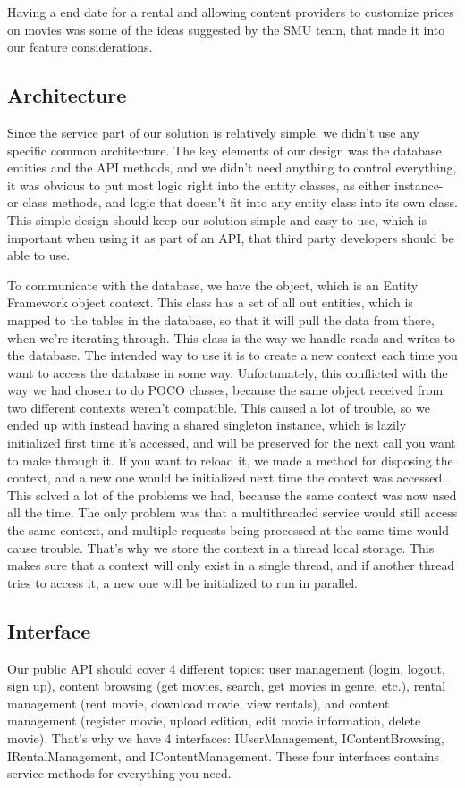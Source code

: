 Having a end date for a rental and allowing content providers to customize prices on movies was some of the ideas suggested by the SMU team, that made it into our feature considerations. 

\subsection{Architecture}
\label{Design_Service_Architecture}
Since the service part of our solution is relatively simple, we didn't use any specific common architecture. The key elements of our design was the database entities and the API methods, and we didn't need anything to control everything, it was obvious to put most logic right into the entity classes, as either instance- or class methods, and logic that doesn't fit into any entity class into its own class. This simple design should keep our solution simple and easy to use, which is important when using it as part of an API, that third party developers should be able to use.

To communicate with the database, we have the  object, which is an Entity Framework object context. This class has a set of all out entities, which is mapped to the tables in the database, so that it will pull the data from there, when we're iterating through. This class is the way we handle reads and writes to the database. The intended way to use it is to create a new context each time you want to access the database in some way. Unfortunately, this conflicted with the way we had chosen to do POCO classes, because the same object received from two different contexts weren't compatible. This caused a lot of trouble, so we ended up with instead having a shared singleton instance, which is lazily initialized first time it's accessed, and will be preserved for the next call you want to make through it. If you want to reload it, we made a method for disposing the context, and a new one would be initialized next time the context was accessed. This solved a lot of the problems we had, because the same context was now used all the time. The only problem was that a multithreaded service would still access the same context, and multiple requests being processed at the same time would cause trouble. That's why we store the context in a thread local storage. This makes sure that a context will only exist in a single thread, and if another thread tries to access it, a new one will be initialized to run in parallel.

\subsection{Interface}
\label{Design_Service_Interface}
Our public API should cover 4 different topics: user management (login, logout, sign up), content browsing (get movies, search, get movies in genre, etc.), rental management (rent movie, download movie, view rentals), and content management (register movie, upload edition, edit movie information, delete movie). That's why we have 4 interfaces: IUserManagement, IContentBrowsing, IRentalManagement, and IContentManagement. These four interfaces contains service methods for everything you need.

